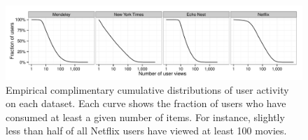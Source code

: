 







\begin{figure}[t!]
  \includegraphics[width=\textwidth]{figures/user_activity_cdf.pdf}
\caption{Empirical complimentary cumulative distributions of user activity on each dataset. Each curve shows the fraction of users who have consumed at least a given number of items. For instance, slightly less than half of all Netflix users have viewed at least 100 movies.}
\label{fig:marginals}
\end{figure}

